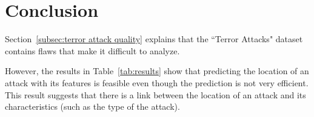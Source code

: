 \section{Conclusion}
\label{sec:Conclusion}
Section~\ref{subsec:terror attack quality} explains that the ``Terror Attacks" dataset contains flaws that make it difficult to analyze.

However, the results in Table~\ref{tab:results} show that predicting the location of an attack with its features is feasible even though the prediction is not very efficient. This result suggests that there is a link between the location of an attack and its characteristics (such as the type of the attack).